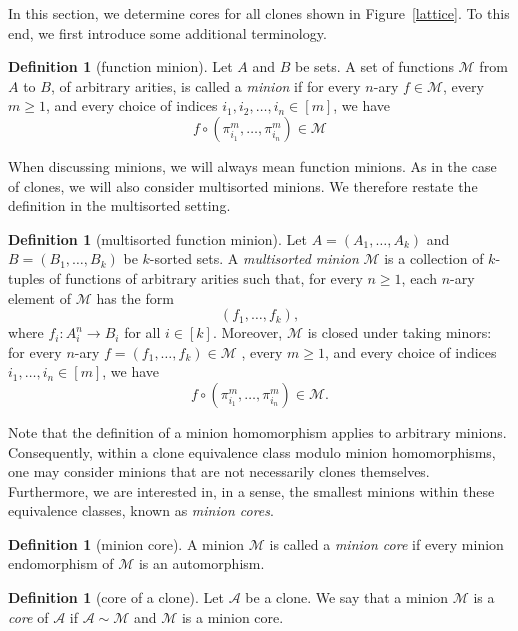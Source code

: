 \documentclass{amsart}
\numberwithin{equation}{section}
\theoremstyle{plain}
\theoremstyle{definition}
\newtheorem{definition}[theorem]{Definition}
\def\set#1{#1}
\def\clone#1{\mathcal{#1}}
\def\minion#1{\mathcal{#1}}
\begin{document}
In this section, we determine cores for all clones shown in Figure~\ref{lattice}. To this end, we first introduce some additional terminology.  

\begin{definition}[function minion]
  Let $\set{A}$ and $\set{B}$ be sets. A set of functions $\minion{M}$ from $\set{A}$ to $\set{B}$, of arbitrary arities,  is called a {\em minion} if for every $n$-ary $f\in \minion{M}$, every $m\geq 1$, and every choice of indices $i_1,i_2,\dots,i_n\in [m]$, we have
  $$f\circ(\pi_{i_1}^m,\dots,\pi_{i_n}^m)\in \minion{M}$$
\end{definition}

When discussing minions, we will always mean function minions. As in the case of clones, we will also consider multisorted minions. We therefore restate the definition in the multisorted setting. 

\begin{definition}[multisorted function minion] 
Let $\set{A}=(A_1,\dots,A_k)$ and $\set{B}=(B_1,\dots,B_k)$ be $k$-sorted sets. A {\em multisorted minion} $\minion{M}$ is a collection of $k$-tuples of functions of arbitrary arities such that, for every $n\geq 1$, each $n$-ary element of $\minion{M}$ has the form 
$$(f_1,\dots,f_k),$$ 
where $f_i\colon A_i^n \to B_i$ for all $i\in [k]$. Moreover, $\minion{M}$ is closed under taking minors: for every $n$-ary $f=(f_1,\dots,f_k)\in \minion{M}$ , every $m\geq 1$, and every choice of indices $i_1,\dots,i_n\in [m]$, we have $$f\circ (\pi_{i_1}^m,\dots,\pi_{i_n}^m)\in \minion{M}.$$
\end{definition}

Note that the definition of a minion homomorphism applies to arbitrary minions. Consequently, within a clone equivalence class modulo minion homomorphisms, one may consider minions that are not necessarily clones themselves. Furthermore, we are interested in, in a sense, the smallest minions within these equivalence classes, known as {\em minion cores}. 

\begin{definition}[minion core]
A minion $\minion{M}$ is called a {\em minion core} if every minion endomorphism of $\minion{M}$ is an automorphism.
\end{definition}

\begin{definition}[core of a clone]
  Let $\clone{A}$ be a clone. We say that a minion $\minion{M}$ is a \emph{core} of $\clone{A}$ if $\clone{A}\sim\minion{M}$ and $\minion{M}$ is a minion core.
\end{definition}
\end{document}

